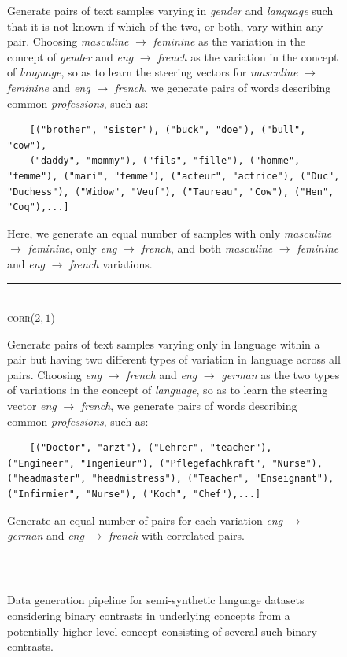 \documentclass{article}
\begin{document}
\begin{figure}
\begin{subbox}
Generate pairs of text samples varying in \textit{gender} and \textit{language} such that it is not known if which of the two, or both, vary within any pair. Choosing \textit{masculine} $\rightarrow$ \textit{feminine} as the variation in the concept of \textit{gender} and \textit{eng} $\rightarrow$ \textit{french} as the variation in the concept of \textit{language}, so as to learn the steering vectors for \textit{masculine} $\rightarrow$ \textit{feminine} and \textit{eng} $\rightarrow$ \textit{french}, we generate pairs of words describing common \textit{professions}, such as: 
\begin{lstlisting}
    [("brother", "sister"), ("buck", "doe"), ("bull", "cow"),
    ("daddy", "mommy"), ("fils", "fille"), ("homme", "femme"), ("mari", "femme"), ("acteur", "actrice"), ("Duc", "Duchess"), ("Widow", "Veuf"), ("Taureau", "Cow"), ("Hen", "Coq"),...]
\end{lstlisting}

Here, we generate an equal number of samples with only \textit{masculine} $\rightarrow$ \textit{feminine}, only \textit{eng} $\rightarrow$ \textit{french}, and both \textit{masculine} $\rightarrow$ \textit{feminine} and \textit{eng} $\rightarrow$ \textit{french} variations.

\rule{\linewidth}{0.5pt}\\

\textsc{corr}($2, 1$) 
\vspace{1mm}

Generate pairs of text samples varying only in language within a pair but having two different types of variation in language across all pairs. Choosing \textit{eng} $\rightarrow$ \textit{french} and \textit{eng} $\rightarrow$ \textit{german} as the two types of variations in the concept of \textit{language}, so as to learn the steering vector \textit{eng} $\rightarrow$ \textit{french}, we generate pairs of words describing common \textit{professions}, such as: 
\begin{lstlisting}
    [("Doctor", "arzt"), ("Lehrer", "teacher"), ("Engineer", "Ingenieur"), ("Pflegefachkraft", "Nurse"), ("headmaster", "headmistress"), ("Teacher", "Enseignant"), ("Infirmier", "Nurse"), ("Koch", "Chef"),...]
\end{lstlisting}

Generate an equal number of pairs for each variation \textit{eng} $\rightarrow$ \textit{german} and \textit{eng} $\rightarrow$ \textit{french} with correlated pairs.

\rule{\linewidth}{0.5pt}\\
\end{subbox}
\caption{Data generation pipeline for semi-synthetic language datasets considering binary contrasts in underlying concepts from a potentially higher-level concept consisting of several such binary contrasts.}
\label{data:binsynth}
\end{figure}
\end{document}
